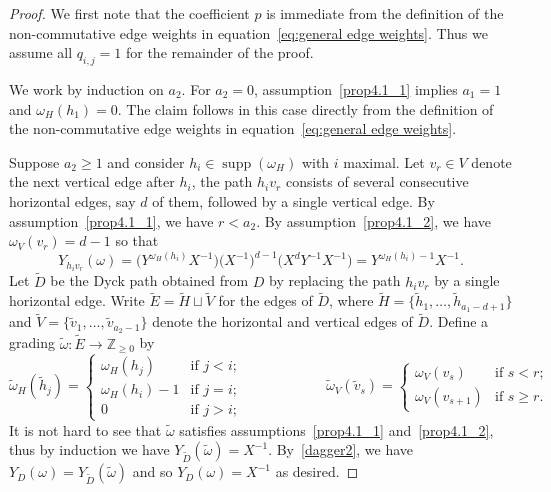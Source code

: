 \documentclass[ALCO,ThmDefs,Unicode,epreuves]{cedram}
\newcommand{\ZZ}{\mathbb{Z}}
\DeclareMathOperator{\supp}{supp}
\begin{document}
\begin{proof}
 We first note that the coefficient $p$ is immediate from the definition of the non-commutative edge weights in equation~\eqref{eq:general edge weights}. 
 Thus we assume all $q_{i,j}=1$ for the remainder of the proof.

 We work by induction on $a_2$. 
 For $a_2=0$, assumption~\ref{prop4.1_1} implies $a_1=1$ and $\omega_H(h_1)=0$. 
 The claim follows in this case directly from the definition of the non-commutative edge weights in equation~\eqref{eq:general edge weights}.

 Suppose $a_2\ge1$ and consider $h_i\in\supp(\omega_H)$ with $i$ maximal.
 Let $v_r\in V$ denote the next vertical edge after $h_i$, \ie the path $h_iv_r$ consists of several consecutive horizontal edges, say $d$ of them, followed by a single vertical edge.
 By assumption~\ref{prop4.1_1}, we have $r<a_2$.
 By assumption~\ref{prop4.1_2}, we have $\omega_V(v_r)=d-1$ so that 
 \begin{equation}\label{dagger2}
 \tag{$\dagger$}
 Y_{h_iv_r}(\omega)=\big(Y^{\omega_H(h_i)}X^{-1}\big)\big(X^{-1}\big)^{d-1}\big(X^dY^{-1}X^{-1}\big)=Y^{\omega_H(h_i)-1}X^{-1}.
 \end{equation}
 Let $\widetilde D$ be the Dyck path obtained from $D$ by replacing the path $h_iv_r$ by a single horizontal edge.
 Write $\widetilde E=\widetilde H\sqcup\widetilde V$ for the edges of $\widetilde D$, where $\widetilde H=\{\tilde h_1,\ldots,\tilde h_{a_1-d+1}\}$ and $\widetilde V=\{\tilde v_1,\ldots,\tilde v_{a_2-1}\}$ denote the horizontal and vertical edges of $\widetilde D$.
 Define a grading $\widetilde\omega:\widetilde E\to\ZZ_{\ge0}$ by
 \[\widetilde\omega_H(\tilde h_j)=\begin{cases} \omega_H(h_j) & \text{if $j<i$;}\\ \omega_H(h_i)-1 & \text{if $j=i$;}\\ 0 & \text{if $j>i$;}\end{cases}
 \hspace{1in}
 \widetilde\omega_V(\tilde v_s)=\begin{cases} \omega_V(v_s) & \text{if $s<r$;}\\ \omega_V(v_{s+1}) & \text{if $s\ge r$.}\end{cases}\]
 It is not hard to see that $\widetilde\omega$ satisfies assumptions~\ref{prop4.1_1} and~\ref{prop4.1_2}, thus by induction we have $Y_{\widetilde D}(\widetilde\omega)=X^{-1}$.
 By~\eqref{dagger2}, we have $Y_D(\omega)=Y_{\widetilde D}(\widetilde\omega)$ and so $Y_D(\omega)=X^{-1}$ as desired.
\end{proof}
\end{document}
